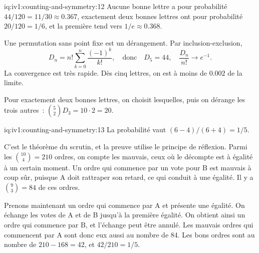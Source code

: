 \begin{solution}{iq:iv1:counting-and-symmetry:12}
Aucune bonne lettre a pour probabilité $44/120 = 11/30 \approx 0.367$, exactement deux bonnes lettres ont pour probabilité $20/120 = 1/6$, et la première tend vers $1/e \approx 0.368$.

Une permutation sans point fixe est un dérangement. Par inclusion-exclusion,
\[
D_n = n! \sum_{k=0}^{n} \frac{(-1)^k}{k!}, \quad\text{donc}\quad D_5 = 44, \quad \frac{D_n}{n!} \to e^{-1}.
\]
La convergence est très rapide. Dès cinq lettres, on est à moins de $0.002$ de la limite.

Pour exactement deux bonnes lettres, on choisit lesquelles, puis on dérange les trois autres~: $\binom{5}{2} D_3 = 10 \cdot 2 = 20$.

\end{solution}

\enlargethispage{-3\baselineskip}%
\begin{solution}{iq:iv1:counting-and-symmetry:13}
La probabilité vaut $(6 - 4)/(6 + 4) = 1/5$.

C'est le théorème du scrutin, et la preuve utilise le principe de réflexion. Parmi les $\binom{10}{4} = 210$ ordres, on compte les mauvais, ceux où le décompte est à égalité à un certain moment. Un ordre qui commence par un vote pour B est mauvais à coup sûr, puisque A doit rattraper son retard, ce qui conduit à une égalité. Il y a $\binom{9}{3} = 84$ de ces ordres.

Prenons maintenant un ordre qui commence par A et présente une égalité. On échange les votes de A et de B jusqu'à la première égalité. On obtient ainsi un ordre qui commence par B, et l'échange peut être annulé. Les mauvais ordres qui commencent par A sont donc eux aussi au nombre de 84. Les bons ordres sont au nombre de $210 - 168 = 42$, et $42/210 = 1/5$.

\end{solution}

